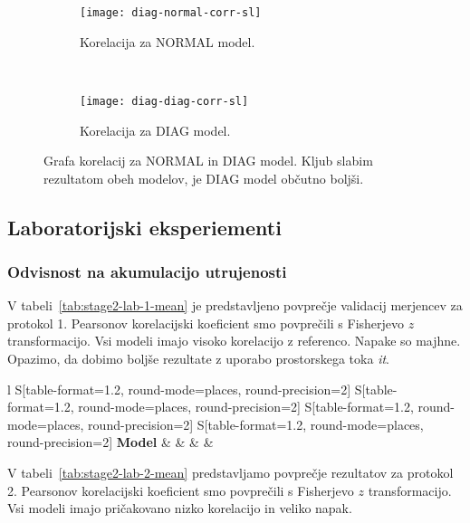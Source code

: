 \begin{figure}[!htb]
	\centering
	\begin{subfigure}[t]{0.45\columnwidth}
		\texttt{[image: diag-normal-corr-sl]}
		\caption{Korelacija za NORMAL model.}
		\label{fig:corr-diag-normal}
	\end{subfigure}
	~
	\begin{subfigure}[t]{0.45\columnwidth}
		\texttt{[image: diag-diag-corr-sl]}
		\caption{Korelacija za DIAG model.}
		\label{fig:corr-diag-diag}
	\end{subfigure}
	\caption[]{Grafa korelacij za NORMAL in DIAG model. Kljub slabim rezultatom obeh modelov, je DIAG model občutno boljši.}
	\label{fig:corr-diag}
\end{figure}


\subsection{Laboratorijski eksperiementi}
\subsubsection{Odvisnost na akumulacijo utrujenosti}
V tabeli~\ref{tab:stage2-lab-1-mean} je predstavljeno povprečje validacij merjencev za protokol 1. Pearsonov korelacijski koeficient \corr smo povprečili s Fisherjevo $z$ transformacijo. Vsi modeli imajo visoko korelacijo z referenco. Napake so majhne. Opazimo, da dobimo boljše rezultate z uporabo prostorskega toka \textit{it}.

\begin{table}[!htbp]
	\centering
	\begin{tabular}{l S[table-format=1.2, round-mode=places, round-precision=2] S[table-format=1.2, round-mode=places, round-precision=2] S[table-format=1.2, round-mode=places, round-precision=2] S[table-format=1.2, round-mode=places, round-precision=2]}
		\toprule
		\textbf{Model} & \thead{\corr} & \thead{\rae} & \thead{\rrse} & \thead{\nsv}\\
		\midrule
		\bottomrule
	\end{tabular}
	\caption[Povprečje validacij merjencev za protokol 1 2. faze lab. eksperimentov]{Povprečje validacij merjencev za protokol 1 druge faze laboratorijskih eksperimentov. \corr smo povprečili s Fisherjevo $z$ transformacijo.}
	\label{tab:stage2-lab-1-mean}
\end{table}

V tabeli~\ref{tab:stage2-lab-2-mean}  predstavljamo povprečje rezultatov za protokol 2. Pearsonov korelacijski koeficient \corr smo povprečili s Fisherjevo $z$ transformacijo. Vsi modeli imajo pričakovano nizko korelacijo in veliko napak.

